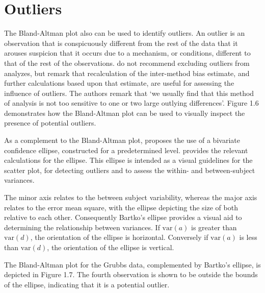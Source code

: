 \documentclass[12pt, a4paper]{report}
\theoremstyle{plain}
\theoremstyle{definition}
\theoremstyle{remark}
\begin{document}
	
	\newpage
	
	\section{Outliers}
	The Bland-Altman plot also can be used to identify outliers. An
	outlier is an observation that is conspicuously different from the
	rest of the data that it arouses suspicion that it occurs due to a
	mechanism, or conditions, different to that of the rest of the
	observations. \citet*{BA99} do not recommend excluding outliers from analyzes,
	but remark that recalculation of the inter-method bias estimate,
	and further calculations based upon that estimate, are useful for
	assessing the influence of outliers. The authors remark that `we
	usually find that this method of analysis is not too sensitive to
	one or two large outlying differences'. Figure 1.6 demonstrates how the Bland-Altman
	plot can be used to visually inspect the presence of potential
	outliers.
	
	As a complement to the Bland-Altman plot, \citet{Bartko} proposes
	the use of a bivariate confidence ellipse, constructed for a
	predetermined level. \citet{AltmanEllipse} provides the relevant calculations for the
	ellipse. This ellipse is intended as a visual
	guidelines for the scatter plot, for detecting outliers and to
	assess the within- and between-subject variances.
	
	The minor axis relates to the between subject variability, whereas
	the major axis relates to the error mean square, with the ellipse
	depicting the size of both relative to each other.
	Consequently Bartko's ellipse provides a visual aid to determining the
	relationship between variances. If $\mbox{var}(a)$ is greater than $\mbox{var}(d)$, the orientation of the ellipse is horizontal. Conversely if $\mbox{var}(a)$ is less than $\mbox{var}(d)$, the orientation of the ellipse is vertical.
	
	
	
	The Bland-Altman plot for the Grubbs data, complemented by Bartko's ellipse, is depicted in Figure 1.7.
	The fourth observation is shown to be outside the bounds of the ellipse, indicating that it is a potential outlier.
	
\end{document}
